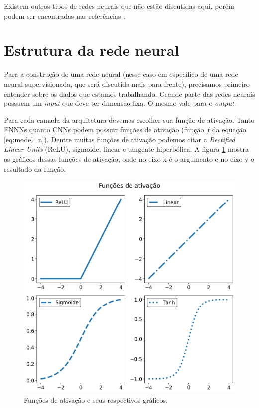 \documentclass[a4paper,12pt,oneside]{book}
\begin{document}
\par Existem outros tipos de redes neurais que não estão discutidas aqui, porém podem ser encontradas nas referências \cite{rbfbook, RNN_fund}.

\section{Estrutura da rede neural}

\par Para a construção de uma rede neural (nesse caso em específico de uma rede neural supervisionada, que será discutida mais para frente), precisamos primeiro entender sobre os dados que estamos trabalhando. Grande parte das redes neurais possuem um \textit{input} que deve ter dimensão fixa. O mesmo vale para o \textit{output}.

\par Para cada camada da arquitetura devemos escolher sua função de ativação. Tanto FNNNs quanto CNNs podem possuir funções de ativação (função $f$ da equação \ref{eq:model_n}). Dentre muitas funções de ativação podemos citar a \textit{Rectified Linear Units} (ReLU)\cite{RELU}, sigmoide\cite{sigmoid_act}, linear e tangente hiperbólica\cite{act_comp}. A figura \ref{fig:ativacoes} mostra os gráficos dessas funções de ativação, onde no eixo x é o argumento e no eixo y o resultado da função.

\begin{figure}[H]
    \centering
    \includegraphics[scale = 0.7]{figs/ativacoes.png}
    \caption{Funções de ativação e seus respectivos gráficos.}
    \label{fig:ativacoes}
\end{figure}
\end{document}
